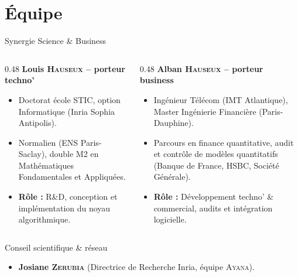 \documentclass[A4,svgnames,9pt,aspectratio=169]{beamer}
\begin{document}
\section{Équipe}
\begin{frame}{Synergie Science \& Business}
    \begin{columns}[T]
        \begin{column}{0.48\textwidth}
            \textbf{\bleu Louis \textsc{Hauseux} -- porteur techno'}
            \begin{itemize}
                \item Doctorat école STIC, option Informatique (Inria Sophia Antipolis).
                \item Normalien (ENS Paris-Saclay), double M2 en Mathématiques Fondamentales et Appliquées.
                \item \textbf{Rôle :} R\&D, conception et implémentation du noyau algorithmique.
            \end{itemize}
        \end{column}
        
        \begin{column}{0.48\textwidth}
            \textbf{\bleu Alban \textsc{Hauseux} -- porteur business}
            \begin{itemize}
                \item Ingénieur Télécom (IMT Atlantique), Master Ingénierie Financière (Paris-Dauphine).
                \item Parcours en finance quantitative, audit et contrôle de modèles quantitatifs (Banque de France, HSBC, Société Générale).
                \item \textbf{Rôle :} Développement techno' \& commercial, audits et intégration logicielle.
            \end{itemize}
        \end{column}
    \end{columns}
    
    \begin{block}{\large Conseil scientifique \& réseau}
        \begin{itemize}
            \item \textbf{Josiane \textsc{Zerubia}} (Directrice de Recherche Inria, équipe \textsc{Ayana}).
        \end{itemize}
    \end{block}
\end{frame}
\end{document}

